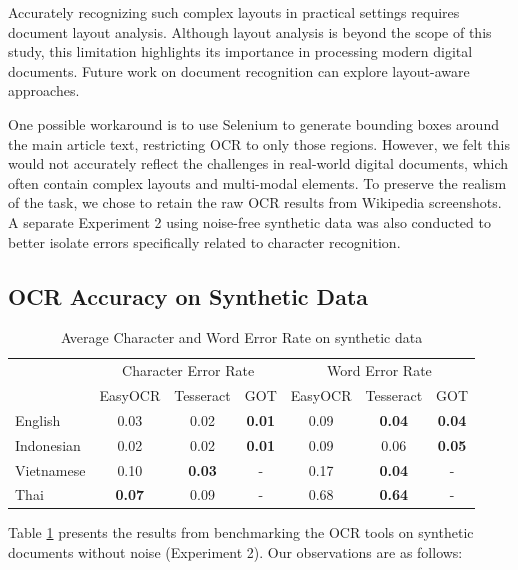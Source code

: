 \documentclass[12pt,oneside]{memoir}
\begin{document}
Accurately recognizing such complex layouts in practical settings requires document layout analysis.
Although layout analysis is beyond the scope of this study, this limitation highlights its importance in processing modern digital documents.
Future work on document recognition can explore layout-aware approaches.

One possible workaround is to use Selenium to generate bounding boxes around the main article text, restricting OCR to only those regions.
However, we felt this would not accurately reflect the challenges in real-world digital documents, which often contain complex layouts and multi-modal elements.
To preserve the realism of the task, we chose to retain the raw OCR results from Wikipedia screenshots. 
A separate Experiment 2 using noise-free synthetic data was also conducted to better isolate errors specifically related to character recognition.

\subsection{OCR Accuracy on Synthetic Data} \label{section:ocr-accuracy-on-synthetic-data}

\begin{table}[ht]
    \centering
    \caption{Average Character and Word Error Rate on synthetic data}
    \label{table:ocr-accuracy-on-synthetic-data}
    \begin{tabular}{lcccccc}
        \toprule
        & \multicolumn{3}{c}{Character Error Rate} & \multicolumn{3}{c}{Word Error Rate}\\
        \cmidrule(lr){2-4}\cmidrule(lr){5-7}
        & EasyOCR & Tesseract & GOT & EasyOCR & Tesseract & GOT\\
        \midrule
        English & 0.03 & 0.02 & \textbf{0.01} & 0.09 & \textbf{0.04} & \textbf{0.04}\\
        Indonesian & 0.02 & 0.02 & \textbf{0.01} & 0.09 & 0.06 & \textbf{0.05}\\
        Vietnamese & 0.10 & \textbf{0.03} & - & 0.17 & \textbf{0.04} & -\\
        Thai & \textbf{0.07} & 0.09 & - & 0.68 & \textbf{0.64} & -\\
        \bottomrule
    \end{tabular}
\end{table}

Table \ref{table:ocr-accuracy-on-synthetic-data} presents the results from benchmarking the OCR tools on synthetic documents without noise (Experiment 2). Our observations are as follows:
\end{document}
